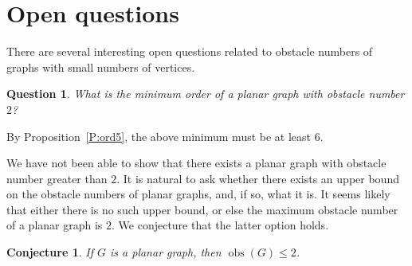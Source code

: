 \documentclass[12pt]{amsart}
\newtheorem{conjecture}[theorem]{Conjecture}
\newtheorem{proposition}[theorem]{Proposition}
\newtheorem{question}[theorem]{Question}
\theoremstyle{remark}
\DeclareMathOperator{\obs}{\ensuremath{\mathrm{obs}}}
\DeclareMathOperator{\obsout}{\ensuremath{\obs_\mathrm{out}}}
\begin{document}
\section{Open questions}

There are several interesting open questions related to obstacle numbers of graphs with small numbers of vertices.

\begin{question}
What is the minimum order of a planar graph
with obstacle number $2$?
\end{question}

By Proposition~\ref{P:ord5},
the above minimum must be at least $6$.

We have not been able to show that there exists
a planar graph with obstacle number greater than $2$.
It is natural to ask whether there exists an upper bound
on the obstacle numbers of planar graphs,
and, if so, what it is.
It seems likely that either there is no such upper bound,
or else the maximum obstacle number of a planar graph
is $2$.
We conjecture that the latter option holds.

\begin{conjecture} \label{J:obsplanar2}
If $G$ is a planar graph,
then $\obs(G)\le 2$.
\end{conjecture}

%
%
%
\end{document}
